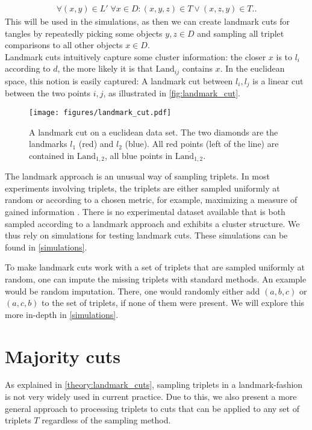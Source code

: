 \begin{align}
    \forall (x,y) \in L' \; \forall x \in D: (x, y, z) \in T \vee (x, z, y) \in T.
.\end{align}
This will be used in the simulations, as then we can create landmark cuts for tangles by 
repeatedly picking some objects $y, z \in D$ and sampling all triplet comparisons to all other objects $x \in D$. \\

Landmark cuts intuitively capture some cluster information: 
the closer $x$ is to $l_i$ according to $d$, the more likely it is that $\text{Land}_{ij}$ contains $x$. 
In the euclidean space, this notion is easily captured: A landmark cut between $l_i, l_j$ is
a linear cut between the two points $i,j$, as illustrated in \autoref{fig:landmark_cut}.

    \begin{figure}[ht]
        \centering
        \texttt{[image: figures/landmark\_cut.pdf]}
        \caption{A landmark cut on a euclidean data set. The two diamonds 
            are the landmarks $l_1$ (red) and $l_2$ (blue). All red points (left of the line) 
            are contained in $\text{Land}_{1,2}$, all blue points in $\overline{\text{Land} _{1,2}}$.
        }
        \label{fig:landmark_cut}
    \end{figure}

The landmark approach is an unusual way of sampling triplets.
In most experiments involving triplets, the triplets are either sampled uniformly at random
\citep{kleindessnerLensDepthFunction2017, haghiriEstimationPerceptualScales2020} 
or according to a chosen metric, for example, maximizing a measure of gained information \citep{roadsEnrichingImageNetHuman2021}. 
There is no experimental dataset available that is both sampled according to a landmark approach and exhibits a cluster structure. 
We thus rely on simulations for testing landmark cuts. These simulations can be found in \autoref{simulations}.

To make landmark cuts work with a set of triplets that are sampled uniformly at random, one can impute the missing triplets with standard methods.
An example would be random imputation. There, one would randomly either add $(a,b,c)$ or $(a,c,b)$ to the set of triplets, if none of them were present.
We will explore this more in-depth in \autoref{simulations}.

\section{Majority cuts}\label{theory:majority_cuts}
As explained in \autoref{theory:landmark_cuts}, sampling triplets in a landmark-fashion is not very widely used in current practice. Due to this, we 
also present a more general approach to processing triplets to cuts that can be applied to any set of triplets $T$ regardless of the sampling method.

